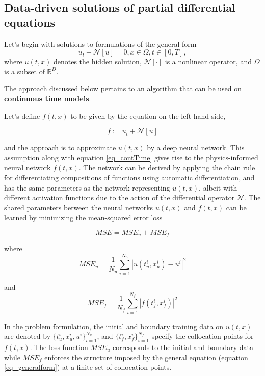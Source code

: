 \documentclass[book.tex]{subfiles}
\begin{document}
\subsection{Data-driven solutions of partial differential equations}
Let's begin with solutions to formulations of the general form 
\begin{equation}
    u_t + \mathcal{N}[u]=0, x \in \Omega, t\in [0,T],
    \label{eq_generalform}
\end{equation}
where $u(t, x)$ denotes the hidden solution, $\mathcal{N[\cdot]}$ is a nonlinear operator, and $\Omega$ is a subset of $\mathbb{R}^D$.

The approach discussed below pertains to an algorithm that can be used on \textbf{continuous time models}.

Let's define $f(t, x)$ to be given by the equation on the left hand side,

\begin{equation}
    f:=u_t + \mathcal{N}[u]
    \label{eq_contTime}
\end{equation}

and the approach is to approximate $u(t,x)$ by a deep neural network. This assumption along with equation \ref{eq_contTime} gives rise to the physics-informed neural network $f(t,x)$. The network can be derived by applying the chain rule for differentiating compositions of functions using automatic differentiation, and has the same parameters as the network representing $u(t, x)$, albeit with different activation functions due to the action of the differential operator $\mathcal{N}$. The shared parameters between the neural networks $u(t, x)$ and $f(t, x)$ can be learned by minimizing the mean-squared error loss

\begin{equation}
    MSE=MSE_u + MSE_f 
\end{equation}



where 
\begin{equation}
    MSE_u=\frac{1}{N_u} \sum_{i=1}^{N_u}|u(t_u^i,x_u^i)-u^i|^2
\end{equation}

and 
\begin{equation}
    MSE_f=\frac{1}{N_f} \sum_{i=1}^{N_f}|f(t_f^i,x_f^i)|^2
\end{equation}

In the problem formulation, the initial and boundary training data on $u(t, x)$ are denoted by $\{{t^i_u, x^i_u, u^i}\}^{N_u}_{i=1}$, and $\{{t^i_f, x^i_f}\}^{N_f}_{i=1}$ specify the collocation points for $f(t, x)$. 
The loss function $MSE_u$ corresponds to the initial and boundary data while $MSE_f$ enforces the structure imposed by the general equation (equation \ref{eq_generalform}) at a finite set of collocation points. 
\end{document}
